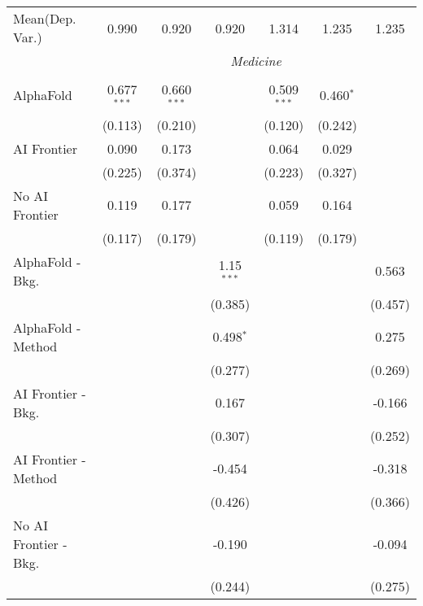 \begin{tabular}{lcccccc}
Mean(Dep. Var.) & 0.990 & 0.920 & 0.920 & 1.314 & 1.235 & 1.235 \\
 & \multicolumn{6}{c}{\textit{Medicine}} \\ \\
   AlphaFold               & 0.677$^{***}$ & 0.660$^{***}$ &              & 0.509$^{***}$ & 0.460$^{*}$ &   \\   
                           & (0.113)       & (0.210)       &              & (0.120)       & (0.242)     &   \\   
   AI Frontier             & 0.090         & 0.173         &              & 0.064         & 0.029       &   \\   
                           & (0.225)       & (0.374)       &              & (0.223)       & (0.327)     &   \\   
   No AI Frontier          & 0.119         & 0.177         &              & 0.059         & 0.164       &   \\   
                           & (0.117)       & (0.179)       &              & (0.119)       & (0.179)     &   \\   
   AlphaFold - Bkg.        &               &               & 1.15$^{***}$ &               &             & 0.563\\   
                           &               &               & (0.385)      &               &             & (0.457)\\   
   AlphaFold - Method      &               &               & 0.498$^{*}$  &               &             & 0.275\\   
                           &               &               & (0.277)      &               &             & (0.269)\\   
   AI Frontier - Bkg.      &               &               & 0.167        &               &             & -0.166\\   
                           &               &               & (0.307)      &               &             & (0.252)\\   
   AI Frontier - Method    &               &               & -0.454       &               &             & -0.318\\   
                           &               &               & (0.426)      &               &             & (0.366)\\   
   No AI Frontier - Bkg.   &               &               & -0.190       &               &             & -0.094\\   
                           &               &               & (0.244)      &               &             & (0.275)\\   

\end{tabular}
